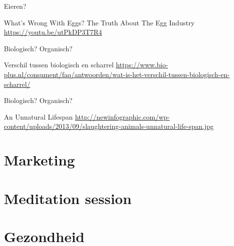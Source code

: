 \documentclass[presentation]{beamer}
\begin{document}
\begin{frame}[label=sec-1-4]{Eieren?}
\begin{alertblock}{What's Wrong With Eggs? The Truth About The Egg Industry}
\url{https://youtu.be/utPkDP3T7R4}
\end{alertblock}
\end{frame}

\begin{frame}[label=sec-1-5]{Biologisch? Organisch?}
\begin{alertblock}{Verschil tussen biologisch en scharrel}
\url{https://www.bio-plus.nl/consument/faq/antwoorden/wat-is-het-verschil-tussen-biologisch-en-scharrel/}
\end{alertblock}
\end{frame}

\begin{frame}[label=sec-1-6]{Biologisch? Organisch?}
\begin{alertblock}{An Unnatural Lifespan}
\url{http://newinfographic.com/wp-content/uploads/2013/09/slaughtering-animals-unnatural-life-span.jpg}
\end{alertblock}
\end{frame}

\section{Marketing}
\label{sec-2}

\section{Meditation session}
\label{sec-3}

\section{Gezondheid}
\label{sec-4}
\end{document}
